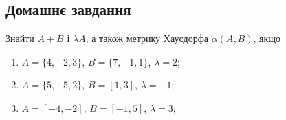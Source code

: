 \subsection{Домашнє завдання}

\begin{problem}
    Знайти $A + B$ і $\lambda A$, а також метрику Хаусдорфа $\alpha(A, B)$, якщо
    \begin{enumerate}
        \item $A = \{4,-2,3\}$, $B = \{7,-1,1\}$, $\lambda=2$;
        \item $A = \{5,-5,2\}$, $B = [1,3]$, $\lambda=-1$;
        \item $A = [-4,-2]$, $B = [-1,5]$, $\lambda=3$;
    \end{enumerate}
\end{problem}



